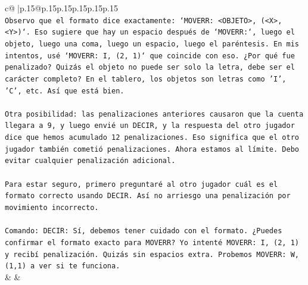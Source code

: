 \documentclass{article}
\begin{document}
{\begin{supertabular}{c@{$\;$}|p{.15\linewidth}@{}p{.15\linewidth}p{.15\linewidth}p{.15\linewidth}p{.15\linewidth}p{.15\linewidth}}
{{{\\ 
\texttt{Observo que el formato dice exactamente: `MOVERR: <OBJETO>, (<X>, <Y>)`. Eso sugiere que hay un espacio después de `MOVERR:`, luego el objeto, luego una coma, luego un espacio, luego el paréntesis. En mis intentos, usé `MOVERR: I, (2, 1)` que coincide con eso. ¿Por qué fue penalizado? Quizás el objeto no puede ser solo la letra, debe ser el carácter completo? En el tablero, los objetos son letras como 'I', 'C', etc. Así que está bien.} \\
\\ 
\texttt{Otra posibilidad: las penalizaciones anteriores causaron que la cuenta llegara a 9, y luego envié un DECIR, y la respuesta del otro jugador dice que hemos acumulado 12 penalizaciones. Eso significa que el otro jugador también cometió penalizaciones. Ahora estamos al límite. Debo evitar cualquier penalización adicional.} \\
\\ 
\texttt{Para estar seguro, primero preguntaré al otro jugador cuál es el formato correcto usando DECIR. Así no arriesgo una penalización por movimiento incorrecto.} \\
\\ 
\texttt{Comando: DECIR: Sí, debemos tener cuidado con el formato. ¿Puedes confirmar el formato exacto para MOVERR? Yo intenté MOVERR: I, (2, 1) y recibí penalización. Quizás sin espacios extra. Probemos MOVERR: W,(1,1) a ver si te funciona.} \\
            }
        }
    }
    & & \\ \\


\end{supertabular}}
\end{document}
